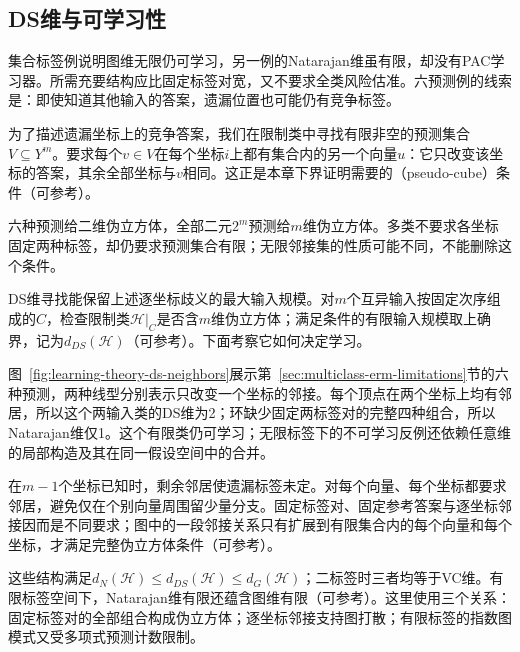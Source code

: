 \subsection{DS维与可学习性}
\label{sec:ds-dimension}

集合标签例说明图维无限仍可学习，另一例的Natarajan维虽有限，却没有PAC学习器。所需充要结构应比固定标签对宽，又不要求全类风险估准。六预测例的线索是：即使知道其他输入的答案，遗漏位置也可能仍有竞争标签。

为了描述遗漏坐标上的竞争答案，我们在限制类中寻找有限非空的预测集合$V\subseteq Y^m$。要求每个$v\in V$在每个坐标$i$上都有集合内的另一个向量$u$：它只改变该坐标的答案，其余全部坐标与$v$相同。这正是本章下界证明需要的（pseudo-cube）条件（可参考）。

六种预测给二维伪立方体，全部二元$2^m$预测给$m$维伪立方体。多类不要求各坐标固定两种标签，却仍要求预测集合有限；无限邻接集的性质可能不同，不能删除这个条件。

DS维寻找能保留上述逐坐标歧义的最大输入规模。对$m$个互异输入按固定次序组成的$C$，检查限制类$\mathcal H|_C$是否含$m$维伪立方体；满足条件的有限输入规模取上确界，记为$d_{DS}(\mathcal H)$（可参考）。下面考察它如何决定学习。

图~\ref{fig:learning-theory-ds-neighbors}展示第~\ref{sec:multiclass-erm-limitations}节的六种预测，两种线型分别表示只改变一个坐标的邻接。每个顶点在两个坐标上均有邻居，所以这个两输入类的DS维为2；环缺少固定两标签对的完整四种组合，所以Natarajan维仅1。这个有限类仍可学习；无限标签下的不可学习反例还依赖任意维的局部构造及其在同一假设空间中的合并。

在$m-1$个坐标已知时，剩余邻居使遗漏标签未定。对每个向量、每个坐标都要求邻居，避免仅在个别向量周围留少量分支。固定标签对、固定参考答案与逐坐标邻接因而是不同要求；图中的一段邻接关系只有扩展到有限集合内的每个向量和每个坐标，才满足完整伪立方体条件（可参考）。

\label{thm:learning-multiclass-dimension-comparison}
这些结构满足$d_N(\mathcal H)\leq d_{DS}(\mathcal H)\leq d_G(\mathcal H)$；二标签时三者均等于VC维。有限标签空间下，Natarajan维有限还蕴含图维有限（可参考）。这里使用三个关系：固定标签对的全部组合构成伪立方体；逐坐标邻接支持图打散；有限标签的指数图模式又受多项式预测计数限制。

